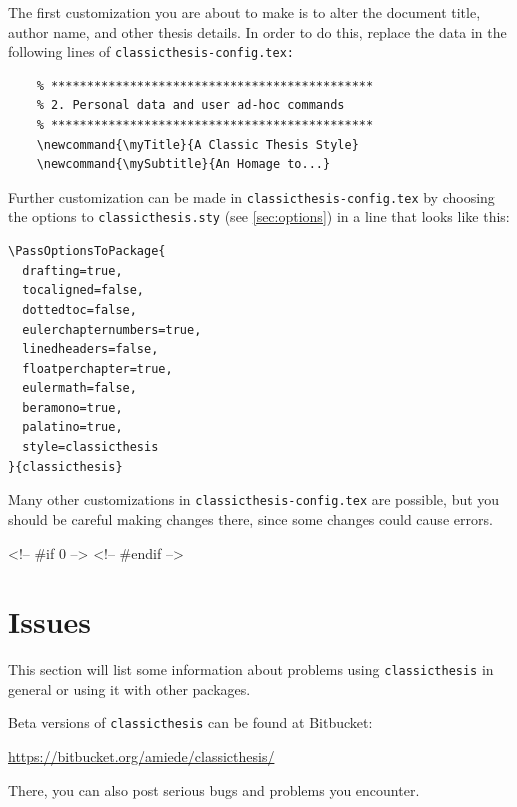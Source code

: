 The first customization you are about to make is to alter the document
title, author name, and other thesis details. In order to do this, replace
the data in the following lines of \texttt{classicthesis-config.tex:}

\begin{lstlisting}
    % *********************************************
    % 2. Personal data and user ad-hoc commands
    % *********************************************
    \newcommand{\myTitle}{A Classic Thesis Style}
    \newcommand{\mySubtitle}{An Homage to...}
\end{lstlisting}

Further customization can be made in \texttt{classicthesis-config.tex}
by choosing the options to \texttt{classicthesis.sty}
(see \autoref{sec:options}) in a line that looks like this:

\begin{lstlisting}
\PassOptionsToPackage{
  drafting=true,
  tocaligned=false,
  dottedtoc=false,
  eulerchapternumbers=true,
  linedheaders=false,
  floatperchapter=true,
  eulermath=false,
  beramono=true,
  palatino=true,
  style=classicthesis
}{classicthesis}
\end{lstlisting}

Many other customizations in \texttt{classicthesis-config.tex} are
possible, but you should be careful making changes there, since some
changes could cause errors.

<!-- #if 0 -->
<!-- #endif -->


\section{Issues}\label{sec:issues}
This section will list some information about problems using
\texttt{classic\-thesis} in general or using it with other packages.

Beta versions of \texttt{classicthesis} can be found at Bitbucket:
\begin{center}
    \url{https://bitbucket.org/amiede/classicthesis/}
\end{center}
There, you can also post serious bugs and problems you encounter.


